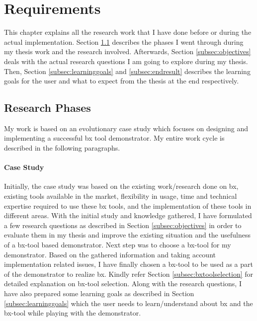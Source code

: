 \section{Requirements}\label{sec:requirements}
This chapter explains all the research work that I have done before or during the actual implementation. Section \ref{subsec:researchphases} describes the phases I went through during my thesis work and the research involved. Afterwards, Section \ref{subsec:objectives} deals with the actual research questions I am going to explore during my thesis. Then, Section \ref{subsec:learninggoals} and \ref{subsec:endresult} describes the learning goals for the user and what to expect from the thesis at the end respectively. 

\subsection{Research Phases}\label{subsec:researchphases}
My work is based on an \ac{evolutionary case study} which focuses on designing and implementing a successful bx tool demonstrator. My entire work cycle is described in the following paragraphs.
\paragraph{Case Study}
Initially, the case study was based on the existing work/research done on bx, existing tools available in the market, flexibility in usage, time and technical expertise required to use these bx tools, and the implementation of these tools in different areas. With the initial study and knowledge gathered, I have formulated a few research questions as described in Section \ref{subsec:objectives} in order to evaluate them in my thesis and improve the existing situation and the usefulness of a bx-tool based demonstrator. 
\newline\newline Next step was to choose a bx-tool for my demonstrator. Based on the gathered information and taking account implementation related issues, I have finally chosen a bx-tool to be used as a part of the demonstrator to realize bx. Kindly refer Section \ref{subsec:bxtoolselection} for detailed explanation on bx-tool selection.
\newline\newline Along with the research questions, I have also prepared some learning goals as described in Section \ref{subsec:learninggoals} which the user needs to learn/understand about bx and the bx-tool while playing with the demonstrator.
